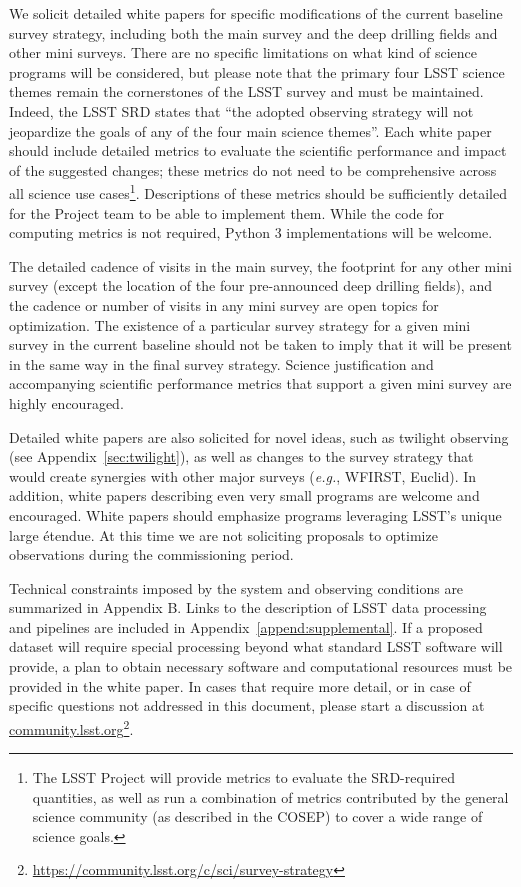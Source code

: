 \documentclass[DM,lsstdraft,toc,usenatbib]{lsstdoc}
\begin{document}
We solicit detailed white papers for specific modifications of the current baseline survey strategy, including 
both the main survey and the deep drilling fields and other mini surveys. There are no 
specific limitations on what kind of science programs will be considered, but please note that 
the primary four LSST science themes remain the cornerstones of the LSST survey and must be
maintained. Indeed, the LSST SRD states that ``the adopted observing 
strategy will not jeopardize the goals of any of the four main science themes''. Each white paper should
include detailed metrics to evaluate the scientific performance and impact of the suggested changes; these metrics
do not need to be comprehensive across all science use cases\footnote{The LSST Project will provide metrics to evaluate
the SRD-required quantities, as well as run a combination of metrics contributed by the general science community
(as described in the COSEP) to cover a wide range of science goals.}. Descriptions of these metrics should be 
sufficiently detailed for the Project team
to be able to implement them. While the code for computing metrics is not required, Python 3 implementations
will be welcome. 

The detailed cadence of visits in the main survey, the footprint for any other mini survey (except the location of the four pre-announced
deep drilling fields), and the cadence or number of visits in any mini survey are open topics for optimization. The existence of a 
particular survey strategy for a given mini survey in the current baseline should not be taken to imply that it will be present in the same way in the final 
survey strategy. Science justification and accompanying scientific performance metrics that support a given mini survey are highly encouraged.

Detailed white papers are also solicited for novel ideas, such as twilight observing (see Appendix~\ref{sec:twilight}), 
as well as changes to the survey strategy that would create synergies with other major surveys ({\it e.g.}, WFIRST, Euclid). 
In addition, white papers describing even very small programs are welcome and encouraged. 
White papers should emphasize programs leveraging LSST's unique large \'{e}tendue.  
At this time we are not soliciting proposals to optimize observations during the commissioning period.

Technical constraints imposed by the system and observing conditions are summarized in 
Appendix B. Links to the description of LSST data processing and pipelines are included in Appendix~\ref{append:supplemental}. If a proposed dataset will require special processing beyond 
what standard LSST software will provide, a plan to obtain necessary software and computational resources 
must be provided in the white paper. In cases that require more detail, or in case of specific questions not 
addressed in this document, please start a discussion at \href{http://community.lsst.org}{community.lsst.org}\footnote{\url{https://community.lsst.org/c/sci/survey-strategy}}.
\end{document}
